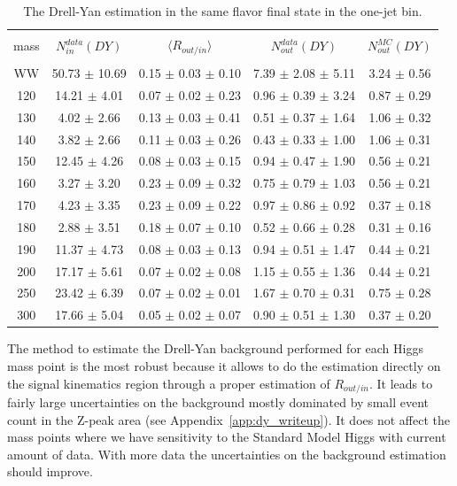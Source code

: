 \begin{table}
\begin{center}
\begin{tabular}{c c c c c}
\hline
\vspace{-3mm} && \\
mass   & $N_{in}^{data}(DY)$ & $\langle R_{out/in} \rangle$ & $N_{out}^{data}(DY)$ & $N_{out}^{MC}(DY)$ \\
\vspace{-3mm} && \\
\hline
WW & 50.73 $\pm$ 10.69 & 0.15 $\pm$ 0.03 $\pm$ 0.10 & 7.39 $\pm$ 2.08 $\pm$ 5.11 & 3.24 $\pm$ 0.56 \\
\hline
120 & 14.21 $\pm$ 4.01 & 0.07 $\pm$ 0.02 $\pm$ 0.23 & 0.96 $\pm$ 0.39 $\pm$ 3.24 & 0.87 $\pm$ 0.29 \\
130 & 4.02 $\pm$ 2.66  & 0.13 $\pm$ 0.03 $\pm$ 0.41 & 0.51 $\pm$ 0.37 $\pm$ 1.64 & 1.06 $\pm$ 0.32 \\
140 & 3.82 $\pm$ 2.66  & 0.11 $\pm$ 0.03 $\pm$ 0.26 & 0.43 $\pm$ 0.33 $\pm$ 1.00 & 1.06 $\pm$ 0.31 \\
150 & 12.45 $\pm$ 4.26 & 0.08 $\pm$ 0.03 $\pm$ 0.15 & 0.94 $\pm$ 0.47 $\pm$ 1.90 & 0.56 $\pm$ 0.21 \\
160 & 3.27 $\pm$ 3.20  & 0.23 $\pm$ 0.09 $\pm$ 0.32 & 0.75 $\pm$ 0.79 $\pm$ 1.03 & 0.56 $\pm$ 0.21 \\
170 & 4.23 $\pm$ 3.35  & 0.23 $\pm$ 0.09 $\pm$ 0.22 & 0.97 $\pm$ 0.86 $\pm$ 0.92 & 0.37 $\pm$ 0.18 \\
180 & 2.88 $\pm$ 3.51  & 0.18 $\pm$ 0.07 $\pm$ 0.10 & 0.52 $\pm$ 0.66 $\pm$ 0.28 & 0.31 $\pm$ 0.16 \\
190 & 11.37 $\pm$ 4.73 & 0.08 $\pm$ 0.03 $\pm$ 0.13 & 0.94 $\pm$ 0.51 $\pm$ 1.47 & 0.44 $\pm$ 0.21 \\
200 & 17.17 $\pm$ 5.61 & 0.07 $\pm$ 0.02 $\pm$ 0.08 & 1.15 $\pm$ 0.55 $\pm$ 1.36 & 0.44 $\pm$ 0.21 \\
250 & 23.42 $\pm$ 6.39 & 0.07 $\pm$ 0.02 $\pm$ 0.01 & 1.67 $\pm$ 0.70 $\pm$ 0.31 & 0.75 $\pm$ 0.28 \\
300 & 17.66 $\pm$ 5.04 & 0.05 $\pm$ 0.02 $\pm$ 0.07 & 0.90 $\pm$ 0.51 $\pm$ 1.30 & 0.37 $\pm$ 0.20 \\     
\hline
\end{tabular}
\caption{The Drell-Yan estimation in the same flavor final state in the one-jet bin.
\label{tab:routin_data_onej}}
\end{center}
\end{table}

The method to estimate the Drell-Yan background performed for each
Higgs mass point is the most robust because it allows to do the
estimation directly on the signal kinematics region through a proper
estimation of $R_{out/in}$.  It leads to fairly large uncertainties on
the background mostly dominated by small event count in the Z-peak
area (see Appendix~\ref{app:dy_writeup}). It does not affect the mass points where we have sensitivity to
the Standard Model Higgs with current amount of data. 
With more data the uncertainties on the background estimation should improve.

